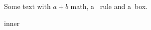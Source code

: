 
 
Some text with $a+b$ math, a \vrule\ rule\kern1pt and \hbox{a box}.

\vbox{\hbox{inner}}\hbox{}\par
\bye
